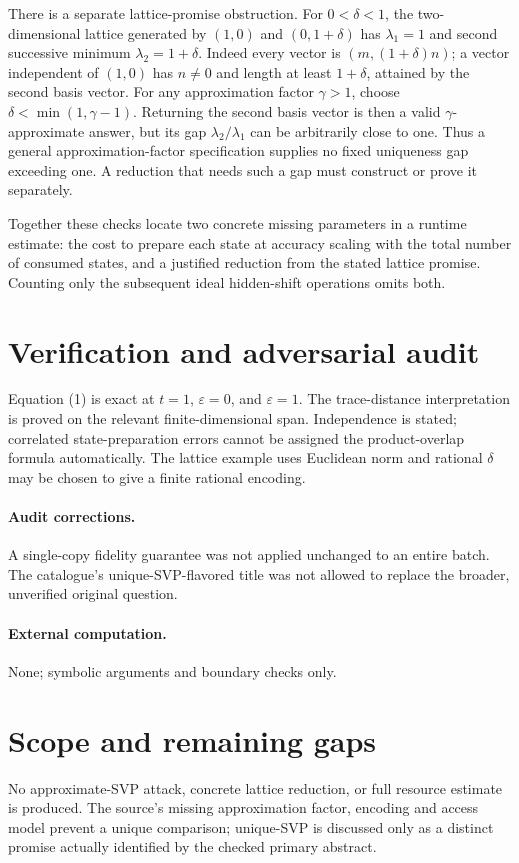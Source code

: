 \documentclass[11pt]{article}
\begin{document}
There is a separate lattice-promise obstruction. For $0<\delta<1$, the two-dimensional lattice generated by $(1,0)$ and $(0,1+\delta)$ has $\lambda_1=1$ and second successive minimum $\lambda_2=1+\delta$. Indeed every vector is $(m,(1+\delta)n)$; a vector independent of $(1,0)$ has $n\ne0$ and length at least $1+\delta$, attained by the second basis vector. For any approximation factor $\gamma>1$, choose $\delta<\min(1,\gamma-1)$. Returning the second basis vector is then a valid $\gamma$-approximate answer, but its gap $\lambda_2/\lambda_1$ can be arbitrarily close to one. Thus a general approximation-factor specification supplies no fixed uniqueness gap exceeding one. A reduction that needs such a gap must construct or prove it separately.

Together these checks locate two concrete missing parameters in a runtime estimate: the cost to prepare each state at accuracy scaling with the total number of consumed states, and a justified reduction from the stated lattice promise. Counting only the subsequent ideal hidden-shift operations omits both.
\section{Verification and adversarial audit}
Equation (1) is exact at $t=1$, $\varepsilon=0$, and $\varepsilon=1$. The trace-distance interpretation is proved on the relevant finite-dimensional span. Independence is stated; correlated state-preparation errors cannot be assigned the product-overlap formula automatically. The lattice example uses Euclidean norm and rational $\delta$ may be chosen to give a finite rational encoding.
\paragraph{Audit corrections.} A single-copy fidelity guarantee was not applied unchanged to an entire batch. The catalogue's unique-SVP-flavored title was not allowed to replace the broader, unverified original question.
\paragraph{External computation.} None; symbolic arguments and boundary checks only.
\section{Scope and remaining gaps}
No approximate-SVP attack, concrete lattice reduction, or full resource estimate is produced. The source's missing approximation factor, encoding and access model prevent a unique comparison; unique-SVP is discussed only as a distinct promise actually identified by the checked primary abstract.
\end{document}
